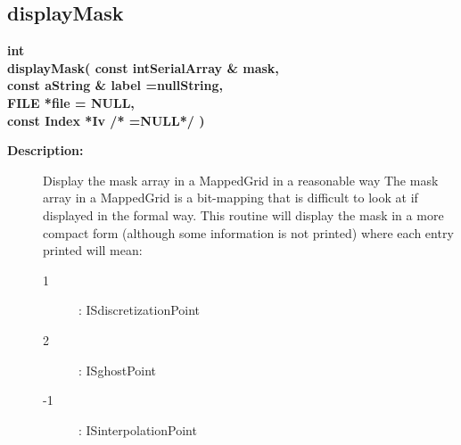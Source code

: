 \subsection{displayMask}
 
\begin{flushleft} \textbf{%
int  \\ 
\settowidth{\displayIncludeArgIndent}{displayMask(}%
displayMask( const intSerialArray \& mask, \\ 
\hspace{\displayIncludeArgIndent}const aString \& label  =nullString,\\ 
\hspace{\displayIncludeArgIndent}FILE *file  = NULL, \\ 
\hspace{\displayIncludeArgIndent}const Index *Iv /* =NULL*/ )
}\end{flushleft}
\begin{description}
\item[{\bf Description:}] 
 Display the mask array in a MappedGrid in a reasonable way
 The mask array in a MappedGrid is a bit-mapping that is difficult to look at
 if displayed in the formal way. This routine will display the mask in a more
 compact form (although some information is not printed) where each entry printed will mean:
 \begin{description}
   \item[1] : ISdiscretizationPoint
   \item[2] : ISghostPoint
   \item[-1] : ISinterpolationPoint
 \end{description}   
\end{description}
